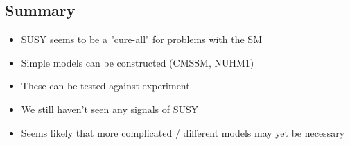 \documentclass{beamer}
\begin{document}
\subsection{Summary}
\begin{frame}{\insertsubsection}
\begin{itemize}
    \item SUSY seems to be a "cure-all" for problems with the SM
    \item Simple models can be constructed (CMSSM, NUHM1)
    \item These can be tested against experiment
    \item We still haven't seen any signals of SUSY
    \item Seems likely that more complicated / different models may yet be
    necessary
\end{itemize}
\end{frame}
\end{document}
